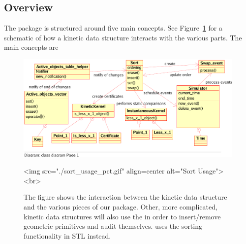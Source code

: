 \subsection{Overview}
\label{sec:overview}
The package is structured around five main concepts. See
Figure~\ref{fig:kds_uml_usage} for a schematic of how a kinetic data
structure interacts with the various parts. The main concepts are
 
\begin{figure}
\begin{ccTexOnly}
\begin{center}
\includegraphics[scale=.8,viewport=0 18 470 250, clip]{Kinetic_data_structures/sort_usage_pct}
\end{center}
\end{ccTexOnly}
\begin{ccHtmlOnly}
<img src="./sort_usage_pct.gif" align=center alt="Sort Usage"><br>
\end{ccHtmlOnly}
\caption{\label{fig:kds_uml_usage} The figure shows the interaction between
  the  kinetic data structure and
  the various pieces of our package.  Other, more complicated, kinetic
  data structures will also use the  in order
  to insert/remove geometric primitives and audit
  themselves.  uses the sorting
  functionality in STL instead.}
\end{figure}

